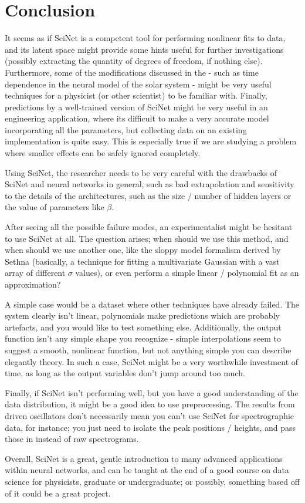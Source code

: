 \documentclass[aps,prl,preprint,groupedaddress]{revtex4-1}
\begin{document}
\section{Conclusion}

It seems as if SciNet is a competent tool for performing nonlinear fits to data, and its latent space might provide some hints useful for further investigations (possibly extracting the quantity of degrees of freedom, if nothing else). Furthermore, some of the modifications discussed in the \cite{iten2020} - such as time dependence in the neural model of the solar system - might be very useful techniques for a physicist (or other scientist) to be familiar with. Finally, predictions by a well-trained version of SciNet might be very useful in an engineering application, where its difficult to make a very accurate model incorporating all the parameters, but collecting data on an existing implementation is quite easy. This is especially true if we are studying a problem where smaller effects can be safely ignored completely.

Using SciNet, the researcher needs to be very careful with the drawbacks of SciNet and neural networks in general, such as bad extrapolation and sensitivity to the details of the architectures, such as the size / number of hidden layers or the value of parameters like $\beta$.

After seeing all the possible failure modes, an experimentalist might be hesitant to use SciNet at all. The question arises; when should we use this method, and when should we use another one, like the sloppy model formalism derived by Sethna (basically, a technique for fitting a multivariate Gaussian with a vast array of different $\sigma$ values), or even perform a simple linear / polynomial fit as an approximation?

A simple case would be a dataset where other techniques have already failed. 
The system clearly isn't linear, polynomials make predictions which are probably artefacts,
and you would like to test something else. 
Additionally, the output function isn't any simple shape you recognize - simple interpolations seem to suggest a smooth, nonlinear function, but not anything simple you can describe elegantly theory. 
In such a case, SciNet might be a very worthwhile investment of time, as long as the output variables don't jump around too much.

Finally, if SciNet isn't performing well, but you have a good understanding of the data distribution, it might be a good idea to use preprocessing. The results from driven oscillators don't necessarily mean you can't use SciNet for spectrographic data, for instance; you just need to isolate the peak positions / heights, and pass those in instead of raw spectrograms. 

Overall, SciNet is a great, gentle introduction to many advanced applications within neural networks, and can be taught at the end of a good course on data science for physicists, graduate or undergraduate; or possibly, something based off of it could be a great project.

\clearpage
{}
\end{document}

